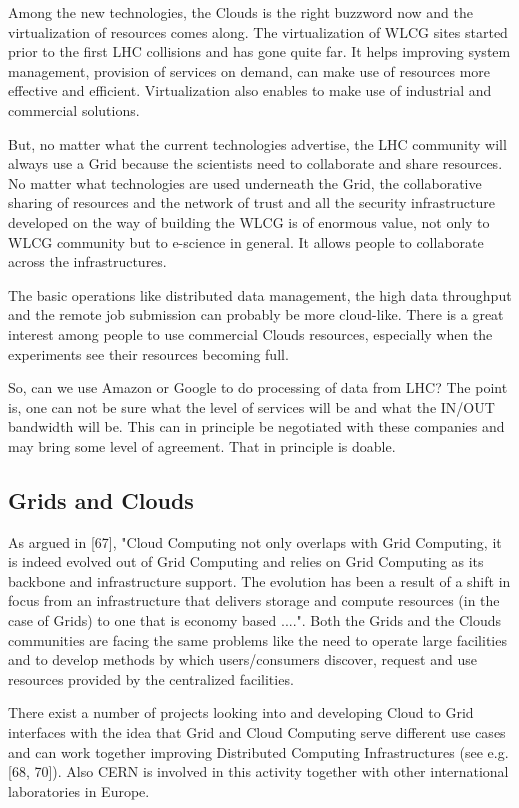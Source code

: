 Among the new technologies, the Clouds
is the right buzzword now and the virtualization of resources comes
along. The virtualization of WLCG sites started prior to the first
LHC collisions and has gone quite far. It helps improving system
management, provision of services on demand, can make use of
resources more effective and efficient. Virtualization also enables
to make use of industrial and commercial solutions.

But, no matter what the current technologies advertise, the LHC
community will always use a Grid because the scientists need to
collaborate and share resources. No matter what technologies are
used underneath the Grid, the collaborative sharing of resources and
the network of trust and all the security infrastructure developed
on the way of building the WLCG is of enormous value, not only to
WLCG community but to e-science in general. It allows people to
collaborate across the infrastructures.

The basic operations like distributed data management, the high data
throughput and the remote job submission can probably be more
cloud-like. There is a great interest among people to use commercial
Clouds resources, especially when the experiments see their
resources becoming full.

So, can we use Amazon or Google to do processing of data from LHC?
The point is, one can not be sure what the level of services will be
and what the IN/OUT bandwidth will be. This can in principle be
negotiated with these companies and may bring some level of
agreement. That in principle is doable.


\subsection{Grids and Clouds}

As argued in [67], "Cloud Computing not only overlaps with Grid
Computing, it is indeed evolved out of Grid Computing and relies on
Grid Computing as its backbone and infrastructure support. The
evolution has been a result of a shift in focus from an
infrastructure that delivers storage and compute resources (in the
case of Grids) to one that is economy based ....". Both the Grids
and the Clouds communities are facing the same problems like the
need to operate large facilities and to develop  methods by which
users/consumers discover, request and use resources provided by the
centralized facilities.

There exist a number of projects looking into and developing Cloud
to Grid interfaces with the idea that Grid and Cloud Computing serve
different use cases and can work together improving Distributed
Computing Infrastructures (see e.g. [68, 70]). Also CERN is involved
in this activity together with other international laboratories in
Europe.

